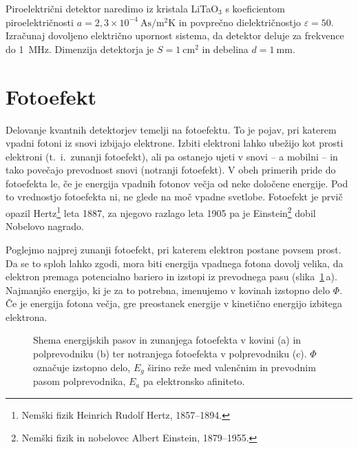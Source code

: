 \begin{definition}
Piroelektrični detektor naredimo iz kristala LiTaO$_3$ 
s koeficientom piroelektričnosti
$a = 2,3 \times 10^{-4}~\si{\ampere \second /\metre^2 \kelvin}$ in povprečno 
dielektričnostjo $\varepsilon = 50$. Izračunaj dovoljeno električno upornost sistema, 
da detektor deluje za frekvence do 1~MHz. 
Dimenzija detektorja je $S = 1~\si{\centi\metre^2}$ in debelina $d = 1~\si{\milli\metre}$.
\end{definition}

\section{Fotoefekt}
Delovanje kvantnih detektorjev temelji na fotoefektu. 
To je pojav, pri katerem vpadni
fotoni iz snovi izbijajo elektrone. Izbiti elektroni lahko ubežijo kot prosti elektroni
(t.\ i.\ zunanji fotoefekt),
ali pa ostanejo ujeti v snovi -- a mobilni -- in tako povečajo 
prevodnost snovi (notranji fotoefekt). 
V obeh primerih pride do fotoefekta le, 
če je energija vpadnih fotonov večja od neke določene energije.
Pod to vrednostjo fotoefekta ni, ne glede na moč vpadne svetlobe.
Fotoefekt je prvič opazil Hertz\footnote{Nemški fizik Heinrich Rudolf Hertz, 1857--1894.} 
leta 1887, za njegovo razlago leta
1905 pa je Einstein\footnote{Nemški fizik in nobelovec Albert Einstein, 1879--1955.} 
dobil Nobelovo nagrado. 

Poglejmo najprej zunanji fotoefekt, pri katerem elektron postane povsem prost. 
Da se to sploh lahko zgodi, mora biti energija vpadnega fotona dovolj velika, da 
elektron premaga potencialno bariero in izstopi iz prevodnega pasu (slika~\ref{fig:Nivoji}\,a). 
Najmanjšo energijo, ki je za to potrebna, imenujemo v kovinah izstopno delo $\Phi$. 
Če je energija fotona večja, gre preostanek energije v kinetično energijo izbitega
elektrona.

\begin{figure}[h]
\centering
\def\svgwidth{140truemm} 

\caption{Shema energijskih pasov in zunanjega fotoefekta v kovini (a) in polprevodniku (b) ter
notranjega fotoefekta v polprevodniku (c). $\Phi$ označuje izstopno delo, $E_g$ širino reže 
med valenčnim in prevodnim pasom polprevodnika,
$E_a$ pa elektronsko afiniteto. }
\label{fig:Nivoji}
\end{figure}

